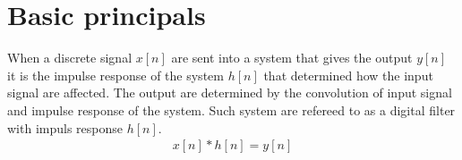\section{Basic principals}
When a discrete signal $x[n]$ are sent into a system that gives the output $y[n]$ it is the impulse response of the system $h[n]$ that determined how the input signal are affected. The output are determined by the convolution of input signal and impulse response of the system. Such system are refereed to as a digital filter with impuls response $h[n]$. 
\begin{align}
x[n]*h[n]=y[n]
\end{align}    

